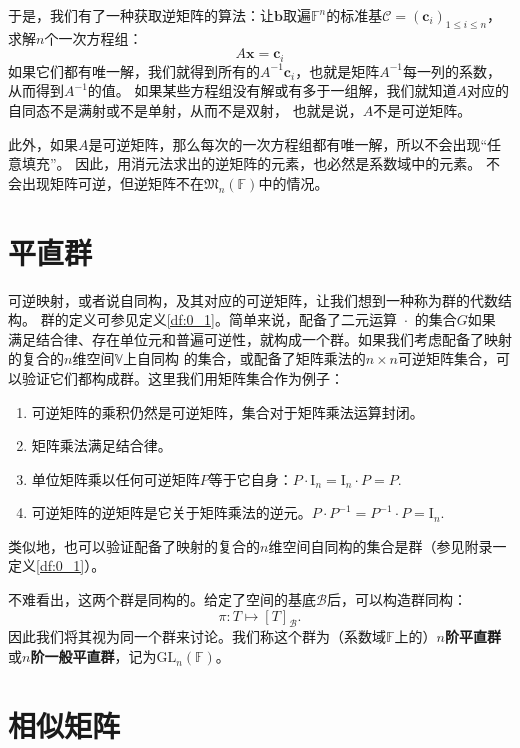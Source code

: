 \documentclass[12pt,UTF8]{ctexbook}
\begin{document}
于是，我们有了一种获取逆矩阵的算法：让$\mathbf{b}$取遍$\mathbb{F}^n$的标准基$\mathcal{C} = (\mathbf{c}_i)_{1\leqslant i \leqslant n}$，求解$n$个一次方程组：
$$ A\mathbf{x} = \mathbf{c}_i$$
如果它们都有唯一解，我们就得到所有的$A^{-1}\mathbf{c}_i$，也就是矩阵$A^{-1}$每一列的系数，从而得到$A^{-1}$的值。
如果某些方程组没有解或有多于一组解，我们就知道$A$对应的自同态不是满射或不是单射，从而不是双射，
也就是说，$A$不是可逆矩阵。

此外，如果$A$是可逆矩阵，那么每次的一次方程组都有唯一解，所以不会出现“任意填充”。
因此，用消元法求出的逆矩阵的元素，也必然是系数域中的元素。
不会出现矩阵可逆，但逆矩阵不在$\mathfrak{M}_n(\mathbb{F})$中的情况。

\section{平直群}
可逆映射，或者说自同构，及其对应的可逆矩阵，让我们想到一种称为群的代数结构。
群的定义可参见定义\ref{df:0_1}。简单来说，配备了二元运算$\,\,\cdot\,\,$的集合$G$如果
满足结合律、存在单位元和普遍可逆性，就构成一个群。如果我们考虑配备了映射的复合的$n$维空间$\mathbb{V}$上自同构
的集合，或配备了矩阵乘法的$n\times n$可逆矩阵集合，可以验证它们都构成群。这里我们用矩阵集合作为例子：
\begin{enumerate}
    \item 可逆矩阵的乘积仍然是可逆矩阵，集合对于矩阵乘法运算封闭。
    \item 矩阵乘法满足结合律。
    \item 单位矩阵乘以任何可逆矩阵$P$等于它自身：$P \cdot \mathrm{I}_n = \mathrm{I}_n \cdot P = P.$
    \item 可逆矩阵的逆矩阵是它关于矩阵乘法的逆元。$P \cdot P^{-1} = P^{-1} \cdot P = \mathrm{I}_n.$
\end{enumerate}
类似地，也可以验证配备了映射的复合的$n$维空间自同构的集合是群（参见附录一定义\ref{df:0_1}）。

不难看出，这两个群是同构的。给定了空间的基底$\mathcal{B}$后，可以构造群同构：
$$ \pi : T \mapsto [T]_\mathcal{B}.$$
因此我们将其视为同一个群来讨论。我们称这个群为（系数域$\mathbb{F}$上的）\textbf{$n$阶平直群}或\textbf{$n$阶一般平直群}，记为$\mathrm{GL}_n(\mathbb{F})$。

\section{相似矩阵}
\end{document}
